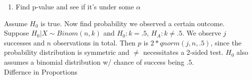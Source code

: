 \documentclass[10pt,landscape]{article}
\begin{document}
\begin{multicols}{3}
\begin{enumerate}
        \item Find p-value and see if it's under some $\alpha$
\end{enumerate}
Assume $H_0$ is true. Now find probability we observed a certain outcome. \\
Suppose $H_0 | X \sim Binom(n, k)$ and $H_0: k = .5$, $H_A: k \ne .5$. 
We observe $j$ successes and $n$ observations in total. Then $p$ is $2 * qnorm(j, n, .5)$, 
since the probability distribution is symmetric and $\ne$ necessitates a 2-sided test. 
$H_0$ also assumes a binomial distribution w/ chance of success being $.5$. \\
Differnce in Proportions\\
\begin{tabular}{@{}p{\the\MyLen}%
        @{}p{\linewidth-\the\MyLen}@{}}


\end{tabular}
\end{multicols}
\end{document}

